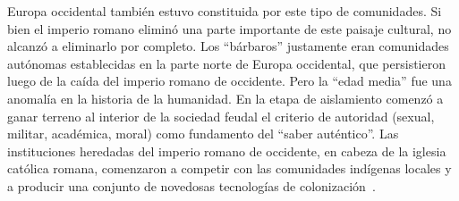 \documentclass[a4paper,10pt]{book}
\theoremstyle{definition}
\begin{document}

Europa occidental también estuvo constituida por este tipo de comunidades.
Si bien el imperio romano eliminó una parte importante de este paisaje cultural, no alcanzó a eliminarlo por completo.
Los ``bárbaros'' justamente eran comunidades autónomas establecidas en la parte norte de Europa occidental, que persistieron luego de la caída del imperio romano de occidente.
Pero la ``edad media'' fue una anomalía en la historia de la humanidad.
En la etapa de aislamiento comenzó a ganar terreno al interior de la sociedad feudal el criterio de autoridad (sexual, militar, académica, moral) como fundamento del ``saber auténtico''.
Las instituciones heredadas del imperio romano de occidente, en cabeza de la iglesia católica romana, comenzaron a competir con las comunidades indígenas locales y a producir una conjunto de novedosas tecnologías de colonización~\cite{zaffaroni2013-cuestionCriminal}. 

\end{document}
